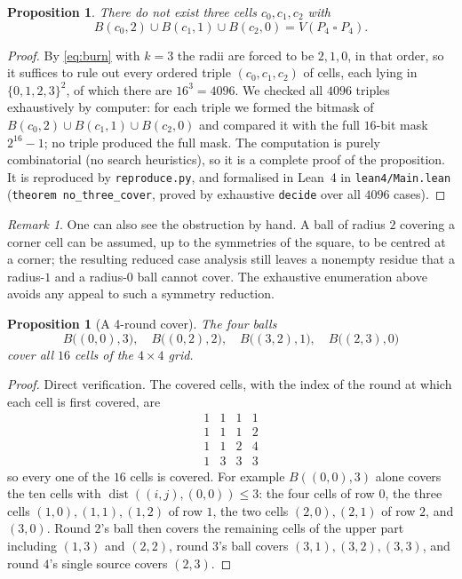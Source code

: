 \documentclass[11pt]{article}
\newtheorem{proposition}[theorem]{Proposition}
\theoremstyle{definition}
\theoremstyle{remark}
\newtheorem{remark}[theorem]{Remark}
\DeclareMathOperator{\dist}{dist}
\begin{document}
\begin{proposition}\label{prop:no3}
There do not exist three cells $c_0,c_1,c_2$ with
\[
  B(c_0,2) \cup B(c_1,1) \cup B(c_2,0) = V(P_4 \mathbin{\square} P_4).
\]
\end{proposition}

\begin{proof}
By \eqref{eq:burn} with $k=3$ the radii are forced to be $2,1,0$, in that
order, so it suffices to rule out every ordered triple
$(c_0,c_1,c_2)$ of cells, each lying in $\{0,1,2,3\}^2$, of which there are
$16^3 = 4096$.
We checked all $4096$ triples exhaustively by computer: for each triple we
formed the bitmask of $B(c_0,2) \cup B(c_1,1) \cup B(c_2,0)$ and compared it
with the full $16$-bit mask $2^{16}-1$; no triple produced the full mask.
The computation is purely combinatorial (no search heuristics), so it is a
complete proof of the proposition.  It is reproduced by
\texttt{reproduce.py}, and formalised in Lean~4 in \texttt{lean4/Main.lean}
(\texttt{theorem\ no\_three\_cover}, proved by exhaustive \texttt{decide} over
all $4096$ cases).
\end{proof}

\begin{remark}
One can also see the obstruction by hand.  A ball of radius $2$ covering a
corner cell can be assumed, up to the symmetries of the square, to be centred
at a corner; the resulting reduced case analysis still leaves a nonempty
residue that a radius-$1$ and a radius-$0$ ball cannot cover.  The exhaustive
enumeration above avoids any appeal to such a symmetry reduction.
\end{remark}

\begin{proposition}[A 4-round cover]\label{prop:four}
The four balls
\[
  B\bigl((0,0),3\bigr),\quad
  B\bigl((0,2),2\bigr),\quad
  B\bigl((3,2),1\bigr),\quad
  B\bigl((2,3),0\bigr)
\]
cover all $16$ cells of the $4 \times 4$ grid.
\end{proposition}

\begin{proof}
Direct verification.  The covered cells, with the index of the round at which
each cell is first covered, are
\[
\begin{array}{cccc}
1 & 1 & 1 & 1\\
1 & 1 & 1 & 2\\
1 & 1 & 2 & 4\\
1 & 3 & 3 & 3
\end{array}
\]
so every one of the $16$ cells is covered.  For example $B((0,0),3)$ alone
covers the ten cells with $\dist((i,j),(0,0)) \le 3$: the four cells of row
$0$, the three cells $(1,0),(1,1),(1,2)$ of row $1$, the two cells
$(2,0),(2,1)$ of row $2$, and $(3,0)$.  Round $2$'s ball then covers the
remaining cells of the upper part including $(1,3)$ and $(2,2)$, round $3$'s
ball covers $(3,1),(3,2),(3,3)$, and round $4$'s single source covers
$(2,3)$.
\end{proof}
\end{document}
